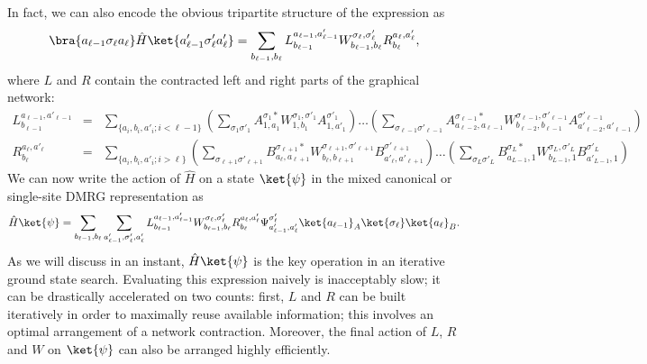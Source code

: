 In fact, we can also encode the obvious tripartite structure of the expression as
\begin{equation}
\bra{a_{\ell-1} \sigma_{\ell} a_{\ell}} \hat{H}  \ket{a'_{\ell-1} \sigma'_{\ell} a'_{\ell}} 
= \sum_{b_{\ell-1}, b_{\ell}} L^{a_{\ell-1},a'_{\ell-1}}_{b_{\ell-1}}  W^{\sigma_{\ell},\sigma'_{\ell}}_{b_{\ell-1},b_{\ell}} R^{a_{\ell},a'_{\ell}}_{b_{\ell}} ,
\end{equation}
where $L$ and $R$ contain the contracted left and right parts of the graphical network: 
\begin{eqnarray}
L^{a_{\ell-1},a'_{\ell-1}}_{b_{\ell-1}} &=& \sum_{\{ a_i, b_i, a'_i; i<\ell-1\} } \left( \sum_{\sigma_1\sigma'_1} A^{\sigma_1*}_{1,a_1} W^{\sigma_1,\sigma'_1}_{1,b_1} A^{\sigma'_1}_{1,a'_1} \right) \ldots \left( \sum_{\sigma_{\ell-1}\sigma'_{\ell-1}} A^{\sigma_{\ell-1} *}_{a_{\ell-2},a_{\ell-1}} W^{\sigma_{\ell-1},\sigma'_{\ell-1}}_{b_{\ell-2},b_{\ell-1}} A^{\sigma'_{\ell-1}}_{a'_{\ell-2},a'_{\ell-1}} \right) 
\label{eq:LdefineinMPO} \\
R^{a_{\ell},a'_{\ell}}_{b_{\ell}} &=& \sum_{\{ a_i, b_i, a'_i; i>\ell\} } 
\left( \sum_{\sigma_{\ell+1}\sigma'_{\ell+1}} B^{\sigma_{\ell+1}*}_{a_{\ell},a_{\ell+1}} W^{\sigma_{\ell+1},\sigma'_{\ell+1}}_{b_{\ell},b_{\ell+1}} B^{\sigma'_{\ell+1}}_{a'_{\ell},a'_{\ell+1}} \right) \ldots \left( \sum_{\sigma_L\sigma'_L} B^{\sigma_L*}_{a_{L-1},1} W^{\sigma_L,\sigma'_L}_{b_{L-1},1} B^{\sigma'_L}_{a'_{L-1},1} \right) 
\end{eqnarray}
We can now write the action of $\hat{H}$ on a state $\ket{\psi}$ in the mixed canonical or single-site DMRG representation as
\begin{equation}
\hat{H}\ket{\psi} = \sum_{b_{\ell-1}, b_{\ell}} \sum_{a'_{\ell-1}, \sigma'_{\ell}, a'_{\ell}}
 L^{a_{\ell-1},a'_{\ell-1}}_{b_{\ell-1}}  W^{\sigma_{\ell},\sigma'_{\ell}}_{b_{\ell-1},b_{\ell}} R^{a_{\ell},a'_{\ell}}_{b_{\ell}} \Psi^{\sigma'_{\ell}}_{a'_{\ell-1},a'_{\ell}} \ket{a_{\ell-1}}_A \ket{\sigma_{\ell}} \ket{a_{\ell}}_B .
\end{equation}
As we will discuss in an instant, $\hat{H}\ket{\psi}$ is the key operation in an iterative ground state search. Evaluating this expression naively is inacceptably slow; it can be drastically accelerated on two counts: first, $L$ and $R$ can be built iteratively in order to maximally reuse available information; this involves an optimal arrangement of a network contraction. Moreover, the final action of $L$, $R$ and $W$ on $\ket{\psi}$ can also be arranged highly efficiently.


